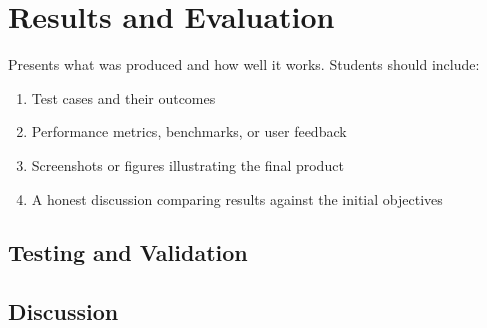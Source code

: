 \section{Results and Evaluation}


Presents what was produced and how well it works. Students should include:

\begin{enumerate}
    \item Test cases and their outcomes
    \item Performance metrics, benchmarks, or user feedback
    \item Screenshots or figures illustrating the final product
    \item A honest discussion comparing results against the initial objectives
\end{enumerate}


\subsection{Testing and Validation}

\subsection{Discussion}

